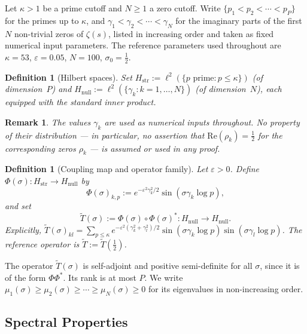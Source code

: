 \documentclass[11pt]{article}
\newtheorem{definition}[theorem]{Definition}
\newtheorem*{remark}{Remark}
\newcommand{\Hstr}{H_{\mathrm{str}}}
\newcommand{\Hnull}{H_{\mathrm{null}}}
\newcommand{\Tt}{\widetilde{T}}
\begin{document}
Let $\kappa>1$ be a prime cutoff and $N\geq 1$ a zero cutoff.
Write $\{p_1<p_2<\cdots<p_P\}$ for the primes up to $\kappa$,
and $\gamma_1<\gamma_2<\cdots<\gamma_N$ for the imaginary parts
of the first $N$ non-trivial zeros of $\zeta(s)$, listed in
increasing order and taken as fixed numerical input parameters.
The reference parameters used throughout are
$\kappa=53$, $\varepsilon=0.05$, $N=100$, $\sigma_0=\tfrac{1}{2}$.

\begin{definition}[Hilbert spaces]
\label{def:spaces}
Set $\Hstr := \ell^2(\{p\text{ prime}: p\leq\kappa\})$
(of dimension~$P$) and $\Hnull := \ell^2(\{\gamma_k: k=1,\ldots,N\})$
(of dimension~$N$), each equipped with the standard inner product.
\end{definition}

\begin{remark}
The values $\gamma_k$ are used as numerical inputs throughout.
No property of their distribution --- in particular, no assertion
that $\mathrm{Re}(\rho_k)=\tfrac{1}{2}$ for the corresponding
zeros $\rho_k$ --- is assumed or used in any proof.
\end{remark}

\begin{definition}[Coupling map and operator family]
\label{def:coupling}
Let $\varepsilon>0$.
Define $\Phi(\sigma)\colon\Hstr\to\Hnull$ by
\[
\Phi(\sigma)_{k,p} := e^{-\varepsilon^2\gamma_k^2/2}\sin(\sigma\gamma_k\log p),
\]
and set
\[
\Tt(\sigma) := \Phi(\sigma)\circ\Phi(\sigma)^*\colon\Hnull\to\Hnull.
\]
Explicitly,
$\Tt(\sigma)_{kl}
  = \sum_{p\leq\kappa} e^{-\varepsilon^2(\gamma_k^2+\gamma_l^2)/2}
    \sin(\sigma\gamma_k\log p)\sin(\sigma\gamma_l\log p)$.
The reference operator is $\Tt := \Tt(\tfrac{1}{2})$.
\end{definition}

The operator $\Tt(\sigma)$ is self-adjoint and positive semi-definite
for all $\sigma$, since it is of the form $\Phi\Phi^*$.
Its rank is at most $P$.
We write $\mu_1(\sigma)\geq\mu_2(\sigma)\geq\cdots\geq\mu_N(\sigma)\geq 0$
for its eigenvalues in non-increasing order.

\subsection{Spectral Properties}
\label{ssec:spectral}
\end{document}
